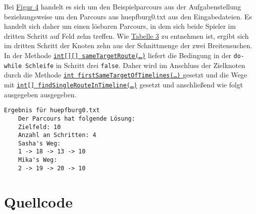 \documentclass[a4paper,10pt,ngerman]{scrartcl}
\begin{document}
	Bei \hyperref[fig:Figure4]{Figur 4} handelt es sich um den Beispielparcours aus der Aufgabenstellung
	beziehungsweise um den Parcours aus huepfburg0.txt aus den Eingabedateien.
	Es handelt sich daher um einen lösbaren Parcours, 
	in dem sich beide Spieler im dritten Schritt auf Feld zehn treffen.
	Wie \hyperref[tab:Table3]{Tabelle 3} zu entnehmen ist, ergibt sich im dritten Schritt der Knoten zehn aus
	der Schnittmenge der zwei Breitensuchen.
	In der Methode \hyperref[lst:sameTargetRoute]{\texttt{int[][] sameTargetRoute(\ldots)}} 
	liefert die Bedingung in der \texttt{do-while Schleife} in Schritt drei \texttt{false}.
	Daher wird im Anschluss der Zielknoten durch die Methode 
	\hyperref[lst:firstSameTargetOfTimelines]{\texttt{int firstSameTargetOfTimelines(\ldots)} }
	gesetzt und die Wege mit \hyperref[lst:findSingleRouteInTimeline]{\texttt{int[] findSingleRouteInTimeline(\ldots)}} gesetzt und anschließend wie folgt ausgegeben ausgegeben.
	
	\begin{lstlisting}[frame=single, title=Programmausgabe Figur 4., breaklines=true]
  Ergebnis für huepfburg0.txt
	Der Parcours hat folgende Lösung:
	Zielfeld: 10
	Anzahl an Schritten: 4
	Sasha's Weg: 
	1 -> 18 -> 13 -> 10
	Mika's Weg: 
	2 -> 19 -> 20 -> 10
    \end{lstlisting}
    \newpage
    \section{Quellcode}
    \label{sec:quellcode}
    \label{LastPage}
	
\end{document}
